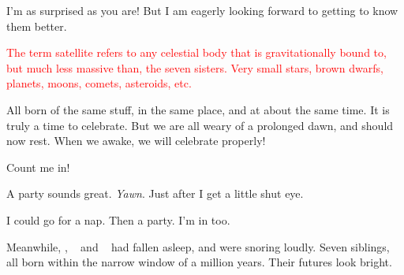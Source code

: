 \documentclass[main.tex]{subfiles}
\begin{document}
\par \Electra I'm as surprised as you are!  But I am eagerly looking forward to getting to know them better.

\begin{tcolorbox}[sharp corners, colback=red!30, colframe=red!80!blue, title=Satellites]
\par \textcolor{red} {The term satellite refers to any celestial body that is gravitationally bound to, but much less massive than, the seven sisters.  Very small stars, brown dwarfs, planets, moons, comets, asteroids, etc.} 
\end{tcolorbox} 

\par \Maia All born of the same stuff, in the same place, and at about the same time.  It is truly a time to celebrate.  But we are all weary of a prolonged dawn, and should now rest.  When we awake, we will celebrate properly!

\par \Merope  Count me in!  

\par \Electra A party sounds great. \textit{Yawn}. Just after I get a little shut eye.

\par \Sterope I could go for a nap. Then a party.  I'm in too.

\par \nar Meanwhile, \rmtaygete, \rmalcyone~ and \rmcelaeno~ had fallen asleep, and were snoring loudly.  Seven siblings, all born within the narrow window of a million years.  Their futures look bright.
\end{document}
